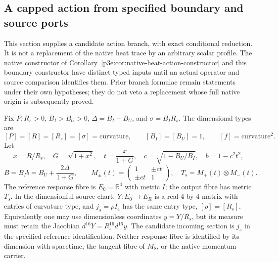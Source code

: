 \documentclass[12pt,a4paper]{article}
\begin{document}
\subsection{A capped action from specified boundary and source ports}
\label{p3e:sec:v223-cap-constructor}
This section supplies a candidate action branch, with exact conditional
reduction.  It is not a replacement of the native heat trace by an
arbitrary scalar profile.  The native constructor of
Corollary~\ref{p3e:cor:native-heat-action-constructor} and this boundary
constructor have distinct typed inputs until an actual operator and
source comparison identifies them.  Prior branch formulae remain
statements under their own hypotheses; they do not veto a replacement
whose full native origin is subsequently proved.

\begin{definition}
\label{p3e:def:v223-cap-data}
Fix $P,R_s>0$, $B_I>B_U>0$, $\Delta=B_I-B_U$, and
$\sigma=B_IR_s$.  The dimensional types are
\[
 [P]=[R]=[R_s]=[\sigma]=\text{curvature},\qquad
 [B_I]=[B_U]=1,\qquad [f]=\text{curvature}^2.
\]
Let
\[
 x=R/R_s,\quad G=\sqrt{1+x^2},\quad t=\frac{x}{1+G},\quad
 c=\sqrt{1-B_U/B_I},\quad b=1-c^2t^2,
\]
\[
 B=B_Ib=B_U+\frac{2\Delta}{1+G},\qquad
 M_\pm(t)=\begin{pmatrix}1&\pm ct\\\pm ct&1\end{pmatrix},
 \quad T_s=M_+(t)\otimes M_-(t).
\]
The reference response fibre is $E_0=\mathbb R^4$ with metric $I$;
the output fibre has metric $T_s$.  In the dimensionful source chart,
$Y:E_0\to E_R$ is a real $4$ by $4$ matrix with entries of curvature
type, and $j_s=\rho I_4$ has the same entry type, $[\rho]=[R_s]$.
Equivalently one may use dimensionless coordinates $y=Y/R_s$, but its
measure must retain the Jacobian $d^{16}Y=R_s^{16}d^{16}y$.
The candidate incoming section is $j_s$ in the specified reference
identification.
Neither response fibre is identified by its dimension with spacetime,
the tangent fibre of $M_8$, or the native momentum carrier.
\end{definition}
\end{document}
